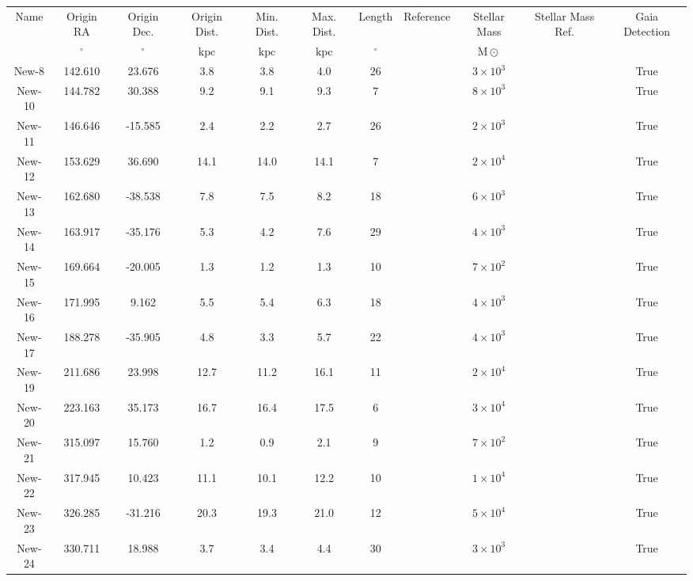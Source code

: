 \begin{table}
\begin{tabular}{ccccccccccc}
\hline \hline
Name & Origin RA & Origin Dec. & Origin Dist. & Min. Dist. & Max. Dist. & Length & Reference & Stellar Mass & Stellar Mass Ref. & Gaia Detection \\
 & $\mathrm{{}^{\circ}}$ & $\mathrm{{}^{\circ}}$ & $\mathrm{kpc}$ & $\mathrm{kpc}$ & $\mathrm{kpc}$ & $\mathrm{{}^{\circ}}$ &  & $\mathrm{M{\odot}}$ &  &  \\
\hline
New-8 & 142.610 & 23.676 & 3.8 & 3.8 & 4.0 & 26 & \citet{ibata:2023} & $3 \times 10^{3}$ &  & True \\
New-10 & 144.782 & 30.388 & 9.2 & 9.1 & 9.3 & 7 & \citet{ibata:2023} & $8 \times 10^{3}$ &  & True \\
New-11 & 146.646 & -15.585 & 2.4 & 2.2 & 2.7 & 26 & \citet{ibata:2023} & $2 \times 10^{3}$ &  & True \\
New-12 & 153.629 & 36.690 & 14.1 & 14.0 & 14.1 & 7 & \citet{ibata:2023} & $2 \times 10^{4}$ &  & True \\
New-13 & 162.680 & -38.538 & 7.8 & 7.5 & 8.2 & 18 & \citet{ibata:2023} & $6 \times 10^{3}$ &  & True \\
New-14 & 163.917 & -35.176 & 5.3 & 4.2 & 7.6 & 29 & \citet{ibata:2023} & $4 \times 10^{3}$ &  & True \\
New-15 & 169.664 & -20.005 & 1.3 & 1.2 & 1.3 & 10 & \citet{ibata:2023} & $7 \times 10^{2}$ &  & True \\
New-16 & 171.995 & 9.162 & 5.5 & 5.4 & 6.3 & 18 & \citet{ibata:2023} & $4 \times 10^{3}$ &  & True \\
New-17 & 188.278 & -35.905 & 4.8 & 3.3 & 5.7 & 22 & \citet{ibata:2023} & $4 \times 10^{3}$ &  & True \\
New-19 & 211.686 & 23.998 & 12.7 & 11.2 & 16.1 & 11 & \citet{ibata:2023} & $2 \times 10^{4}$ &  & True \\
New-20 & 223.163 & 35.173 & 16.7 & 16.4 & 17.5 & 6 & \citet{ibata:2023} & $3 \times 10^{4}$ &  & True \\
New-21 & 315.097 & 15.760 & 1.2 & 0.9 & 2.1 & 9 & \citet{ibata:2023} & $7 \times 10^{2}$ &  & True \\
New-22 & 317.945 & 10.423 & 11.1 & 10.1 & 12.2 & 10 & \citet{ibata:2023} & $1 \times 10^{4}$ &  & True \\
New-23 & 326.285 & -31.216 & 20.3 & 19.3 & 21.0 & 12 & \citet{ibata:2023} & $5 \times 10^{4}$ &  & True \\
New-24 & 330.711 & 18.988 & 3.7 & 3.4 & 4.4 & 30 & \citet{ibata:2023} & $3 \times 10^{3}$ &  & True \\

\end{tabular}
\end{table}
